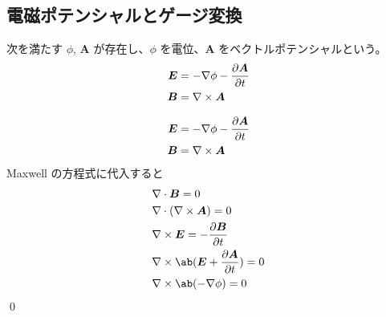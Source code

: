 \documentclass[uplatex,dvipdfmx,a4paper,11pt]{jlreq}
\makeatletter
\newcommand{\EE}{\bm{E}}
\newcommand{\BB}{\bm{B}}
\renewcommand{\AA}{\bm{A}}
\newcommand{\vnabla}{\mathbf{\nabla}}
\theoremstyle{definition}
\renewenvironment{proof}[1][\proofname]{\par
  \normalfont
  \topsep6\p@\@plus6\p@ \trivlist
  \item[\hskip\labelsep{\bfseries #1}\@addpunct{\bfseries}]\ignorespaces\quad\par
}{%
  \qed\endtrivlist\@endpefalse
}
\renewcommand\proofname{証明}
\makeatother
\begin{document}
\subsection{電磁ポテンシャルとゲージ変換}
\begin{theorem}[電位とベクトルポテンシャル]
  次を満たす $\phi$, $\AA$ が存在し、$\phi$ を電位、$\AA$ をベクトルポテンシャルという。
  \begin{align}
    \EE & = - \vnabla\phi - \diffp{\AA}{t} \\
    \BB & = \vnabla\times\AA
  \end{align}
\end{theorem}
\begin{proof}
  \begin{align}
    \EE & = - \vnabla\phi - \diffp{\AA}{t} \\
    \BB & = \vnabla\times\AA
  \end{align}
  Maxwell の方程式に代入すると
  \begin{align}
     & \vnabla\cdot\BB = 0                        \\
     & \vnabla\cdot(\vnabla\times\AA) = 0         \\
     & \vnabla\times\EE = -\diffp{\BB}{t}         \\
     & \vnabla\times\ab(\EE + \diffp{\AA}{t}) = 0 \\
     & \vnabla\times\ab(-\vnabla\phi) = 0
  \end{align}
\end{proof}
\end{document}
